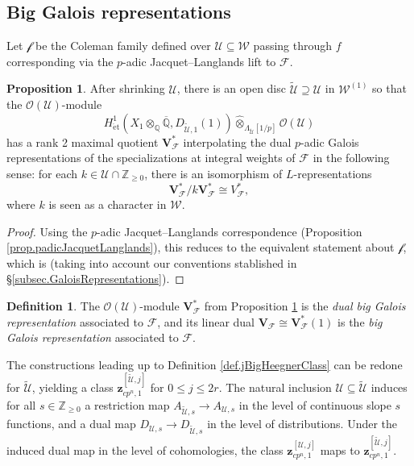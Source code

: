 \documentclass[a4paper]{amsart}
\numberwithin{equation}{section}
\theoremstyle{definition}
\newtheorem{proposition}[theorem]{Proposition}
\newtheorem{definition}[theorem]{Definition}
\newcommand{\Q}{\mathbb{Q}}
\newcommand{\Z}{\mathbb{Z}}
\DeclareMathOperator{\et}{\text{\'et}}
\renewcommand{\et}{\mathrm{\acute{e}t}}
\begin{document}
\subsection{Big Galois representations}\label{subsec.BigGaloisRepresentations}
Let $\mathscr{f}$ be the Coleman family defined over $\mathscr{U}\subseteq\mathscr{W}$ passing through $f$ corresponding via the $p$-adic Jacquet--Langlands lift to $\mathscr{F}$.

\begin{proposition}\label{prop.BigGaloisRep}
After shrinking $\mathscr{U}$, there is an open disc $\widetilde{\mathscr{U}}\supseteq\mathscr{U}$ in $\mathscr{W}^{(1)}$ so that the $\mathcal{O}(\mathscr{U})$-module \[H^1_{\et}\left(X_1\otimes_{\Q}\overline{\Q},D_{\widetilde{\mathscr{U}},1}(1)\right)\widehat{\otimes}_{\Lambda_{\widetilde{\mathscr{U}}}[1/p]}\mathcal{O}(\mathscr{U})\] has a rank 2 maximal quotient $\mathbf{V}_{\mathscr{F}}^*$ interpolating the dual $p$-adic Galois representations of the specializations at integral weights of $\mathscr{F}$ in the following sense: for each $k\in\mathscr{U}\cap\Z_{\ge 0}$, there is an isomorphism of $L$-representations \[\mathbf{V}_{\mathscr{F}}^*/k\mathbf{V}_{\mathscr{F}}^*\cong V_{\mathcal{F}}^*,\] where $k$ is seen as a character in $\mathscr{W}$.
\end{proposition}

\begin{proof}
Using the $p$-adic Jacquet--Langlands correspondence (Proposition \ref{prop.padicJacquetLanglands}), this reduces to the equivalent statement about $\mathscr{f}$, which is \cite[Theorem 4.6.6]{LoefflerZerbes.Rankin} (taking into account our conventions stablished in \S\ref{subsec.GaloisRepresentations}). 
\end{proof}

\begin{definition}\label{def.BigGaloisRep}
The $\mathcal{O}(\mathscr{U})$-module $\mathbf{V}_\mathscr{F}^*$ from Proposition \ref{prop.BigGaloisRep} is the \textit{dual big Galois representation} associated to $\mathscr{F}$, and its linear dual $\mathbf{V}_\mathscr{F}\cong\mathbf{V}_\mathscr{F}^*(1)$ is the \textit{big Galois representation} associated to $\mathscr{F}$.
\end{definition}

The constructions leading up to Definition \ref{def.jBigHeegnerClass} can be redone for $\widetilde{\mathscr{U}}$, yielding a class $\mathbf{z}^{[\widetilde{\mathscr{U}},j]}_{cp^n,1}$ for $0\le j\le 2r$. The natural inclusion $\mathscr{U}\subseteq\widetilde{\mathscr{U}}$ induces for all $s\in\Z_{\ge 0}$ a restriction map $A_{\widetilde{\mathscr{U}},s}\rightarrow A_{\mathscr{U},s}$ in the level of continuous slope $s$ functions, and a dual map $D_{\mathscr{U},s}\to D_{\widetilde{\mathscr{U}},s}$ in the level of distributions. Under the induced dual map in the level of cohomologies, the class $\mathbf{z}^{[{\mathscr{U}},j]}_{cp^n,1}$ maps to $\mathbf{z}^{[\widetilde{\mathscr{U}},j]}_{cp^n,1}$.
\end{document}
